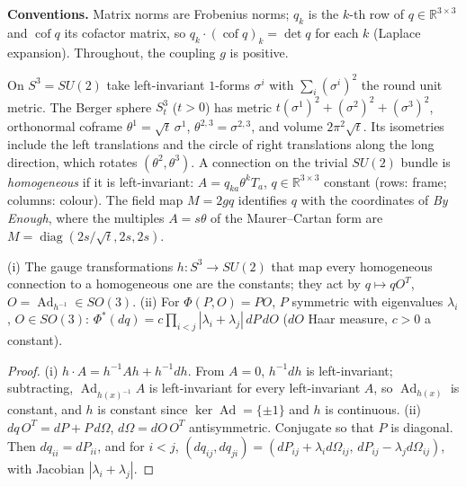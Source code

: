 \newpage
{}

\noindent\textbf{Conventions.} Matrix norms are Frobenius norms; $q_k$ is the $k$-th row of $q\in\mathbb R^{3\times3}$ and
$\operatorname{cof}q$ its cofactor matrix, so $q_k\cdot(\operatorname{cof}q)_k=\det q$ for each $k$ (Laplace expansion).
Throughout, the coupling $g$ is positive.

\begin{definition}\label{p3def:berger}
On $S^3=SU(2)$ take left-invariant $1$-forms $\sigma^i$ with $\sum_i(\sigma^i)^2$ the round unit metric. The Berger sphere
$S^3_t$ ($t>0$) has metric $t(\sigma^1)^2+(\sigma^2)^2+(\sigma^3)^2$, orthonormal coframe $\theta^1=\sqrt t\,\sigma^1$,
$\theta^{2,3}=\sigma^{2,3}$, and volume $2\pi^2\sqrt t$. Its isometries include the left translations and the circle of
right translations along the long direction, which rotates $(\theta^2,\theta^3)$. A connection on the trivial $SU(2)$
bundle is \emph{homogeneous} if it is left-invariant: $A=q_{ka}\theta^kT_a$, $q\in\mathbb R^{3\times3}$ constant (rows:
frame; columns: colour). The field map $M=2gq$ identifies $q$ with the coordinates of \emph{By Enough}, where the
multiples $A=s\theta$ of the Maurer--Cartan form are $M=\operatorname{diag}(2s/\sqrt t,2s,2s)$.
\end{definition}

\begin{lemma}\label{p3lem:quotient}
 (i) The gauge transformations $h:S^3\to SU(2)$ that map every homogeneous connection to a homogeneous
one are the constants; they act by $q\mapsto qO^T$, $O=\operatorname{Ad}_{h^{-1}}\in SO(3)$. (ii) For $\Phi(P,O)=PO$, $P$ symmetric
with eigenvalues $\lambda_i$, $O\in SO(3)$: $\Phi^*(dq)=c\prod_{i<j}|\lambda_i+\lambda_j|\,dP\,dO$ ($dO$ Haar measure, $c>0$ a constant).
\end{lemma}
\begin{proof}
(i) $h\cdot A=h^{-1}Ah+h^{-1}dh$. From $A=0$, $h^{-1}dh$ is left-invariant; subtracting, $\operatorname{Ad}_{h(x)^{-1}}A$ is
left-invariant for every left-invariant $A$, so $\operatorname{Ad}_{h(x)}$ is constant, and $h$ is constant since
$\ker\operatorname{Ad}=\{\pm1\}$ and $h$ is continuous. (ii) $dq\,O^T=dP+P\,d\Omega$, $d\Omega=dO\,O^T$ antisymmetric. Conjugate
so that $P$ is diagonal. Then $dq_{ii}=dP_{ii}$, and for $i<j$,
$(dq_{ij},dq_{ji})=(dP_{ij}+\lambda_id\Omega_{ij},\,dP_{ij}-\lambda_jd\Omega_{ij})$, with Jacobian $|\lambda_i+\lambda_j|$.
\end{proof}

